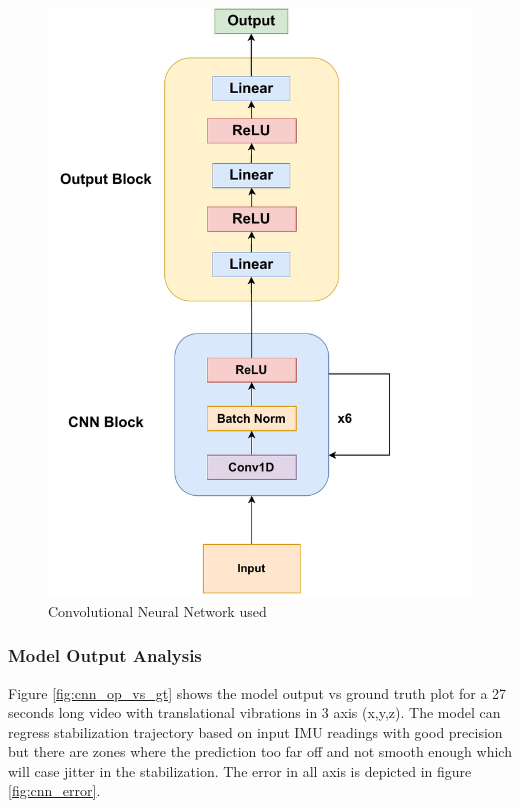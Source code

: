 \begin{figure}
    \centering
    \includegraphics[scale=0.75]{images/fig_chapter2/nns/cnn_mt.pdf}
    \caption{Convolutional Neural Network used}
    \label{fig:cnn_used}
\end{figure}

\subsubsection{Model Output Analysis}
Figure \ref{fig:cnn_op_vs_gt} shows the model output vs ground truth plot for a 27 seconds long video with translational vibrations in 3 axis (x,y,z). The model can regress stabilization trajectory based on input IMU readings with good precision but there are zones where the prediction too far off and not smooth enough which will case jitter in the stabilization. The error in all axis is depicted in figure \ref{fig:cnn_error}.

